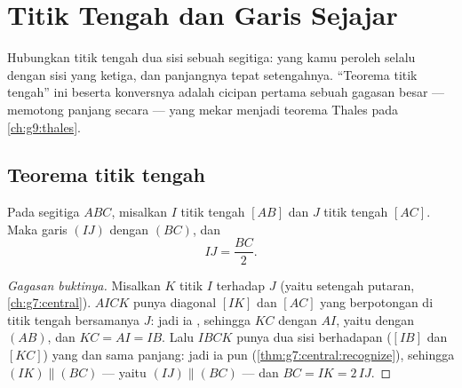 \chapter{Titik Tengah dan Garis Sejajar}\label{ch:g8:midpoints}

Hubungkan titik tengah dua sisi sebuah segitiga:  yang kamu
peroleh selalu  dengan sisi yang ketiga, dan panjangnya tepat
setengahnya. ``Teorema titik tengah'' ini beserta konversnya adalah
cicipan pertama sebuah gagasan besar ---  memotong
panjang secara  --- yang mekar menjadi teorema Thales pada
\cref{ch:g9:thales}.

\section{Teorema titik tengah}

\begin{theorem}\label{thm:g8:midpoints:direct}
Pada segitiga $ABC$, misalkan $I$ titik tengah $[AB]$ dan $J$ titik
tengah $[AC]$. Maka garis $(IJ)$  dengan $(BC)$, dan
\[
IJ = \frac{BC}{2} .
\]
\end{theorem}

\begin{proof}[Gagasan buktinya]
Misalkan $K$ titik  $I$ terhadap $J$ (yaitu setengah putaran,
\cref{ch:g7:central}).  $AICK$ punya diagonal $[IK]$
dan $[AC]$ yang berpotongan di titik tengah bersamanya $J$: jadi ia
, sehingga $KC$  dengan $AI$, yaitu dengan $(AB)$,
dan $KC = AI = IB$. Lalu $IBCK$ punya dua sisi berhadapan ($[IB]$ dan
$[KC]$) yang  dan sama panjang: jadi ia pun 
(\cref{thm:g7:central:recognize}), sehingga $(IK) \parallel (BC)$ ---
yaitu $(IJ) \parallel (BC)$ --- dan $BC = IK = 2\,IJ$.
\end{proof}

